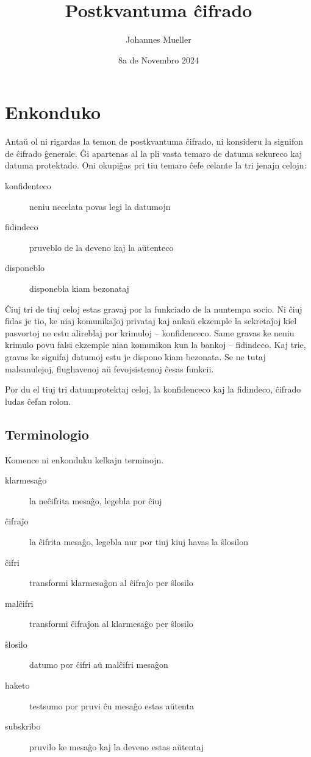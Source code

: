 \documentclass[utf8]{scrartcl}
\title{Postkvantuma ĉifrado}
\author{Johannes Mueller}
\institute{KAEST 2024 – Žilina}
\date{8a de Novembro 2024}
\begin{document}
\section{Enkonduko}

Antaŭ ol ni rigardas la temon de postkvantuma ĉifrado, ni konsideru la signifon
de ĉifrado ĝenerale.  Ĝi apartenas al la pli vasta temaro de datuma sekureco
kaj datuma protektado.  Oni okupiĝas pri tiu temaro ĉefe celante la tri jenajn
celojn:
%
\begin{description}
\item[konfidenteco] neniu necelata povas legi la datumojn
\item[fidindeco] pruveblo de la deveno kaj la aŭtenteco
\item[disponeblo] disponebla kiam bezonataj
\end{description}

Ĉiuj tri de tiuj celoj estas gravaj por la funkciado de la nuntempa socio.  Ni
ĉiuj fidas je tio, ke niaj komunikaĵoj privataj kaj ankaŭ ekzemple la
sekretaĵoj kiel pasvortoj ne estu alireblaj por krimuloj – konfidenceco. Same
gravas ke neniu krimulo povu falsi ekzemple nian komunikon kun la bankoj –
fidindeco.  Kaj trie, gravas ke signifaj datumoj estu je dispono kiam
bezonata. Se ne tutaj malsanulejoj, flughavenoj aŭ fevojsistemoj ĉesas funkcii.

Por du el tiuj tri datumprotektaj celoj, la konfidenceco kaj la fidindeco,
ĉifrado ludas ĉefan rolon.

\subsection{Terminologio}

Komence ni enkonduku kelkajn terminojn.
%
\begin{description}
\item[klarmesaĝo] la neĉifrita mesaĝo, legebla por ĉiuj
\item[ĉifraĵo] la ĉifrita mesaĝo, legebla nur por tiuj kiuj havas la ŝlosilon
\item[ĉifri] transformi klarmesaĝon al ĉifraĵo per ŝlosilo
\item[malĉifri] transformi ĉifraĵon al klarmesaĝo per ŝlosilo
\item[ŝlosilo] datumo por ĉifri aŭ malĉifri mesaĝon
\item[haketo] testsumo por pruvi ĉu mesaĝo estas aŭtenta
\item[subskribo] pruvilo ke mesaĝo kaj la deveno estas aŭtentaj
\end{description}
\end{document}
